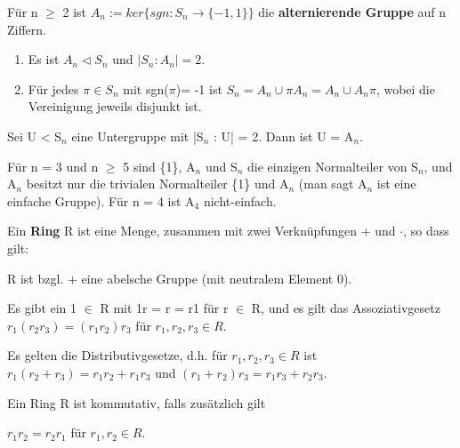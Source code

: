 \begin{definition}
Für n $\ge$ 2 ist $A_n := ker\{sgn : S_n \to \{-1,1\}\}$ die \textbf{alternierende Gruppe} auf n Ziffern.
\begin{enumerate}
\item Es ist $A_n \vartriangleleft S_n$ und $|S_n : A_n| = 2$.
\item Für jedes $\pi \in S_n$ mit sgn($\pi$)= -1 ist $S_n = A_n \cup \pi A_n = A_n \cup A_n \pi$, wobei die Vereinigung jeweils disjunkt ist.
\end{enumerate}
\end{definition}

\begin{example}
Sei U < S$_n$ eine Untergruppe mit |S$_n$ : U| = 2. Dann ist U = A$_n$.
\end{example}

\begin{remark}
Für n = 3 und n $\ge$ 5 sind \{1\}, A$_n$ und S$_n$ die einzigen Normalteiler von S$_n$, und A$_n$ besitzt nur die trivialen Normalteiler \{1\} und A$_n$ (man sagt A$_n$ ist eine einfache Gruppe). Für n = 4 ist A$_4$ nicht-einfach.
\end{remark}

\begin{definition}
Ein \textbf{Ring} R ist eine Menge, zusammen mit zwei Verknüpfungen + und $\cdot$, so dass gilt:
\begin{compactenum}
\item R ist bzgl. + eine abelsche Gruppe (mit neutralem Element 0).
\item Es gibt ein 1 $\in$ R mit 1r = r = r1 für r $\in$ R, und es gilt das Assoziativgesetz $r_1(r_2r_3) = (r_1r_2)r_3$ für $r_1, r_2, r_3 \in R$.
\item Es gelten die Distributivgesetze, d.h. für $r_1, r_2, r_3 \in R$ ist $r_1(r_2 + r_3) = r_1r_2 + r_1r_3$ und $(r_1 + r_2)r_3 = r_1r_3 + r_2r_3$.
\end{compactenum}
Ein Ring R ist kommutativ, falls zusätzlich gilt
\begin{compactenum}
\setcounter{enumi}{3}
\item $r_1r_2 = r_2r_1$ für $r_1,r_2 \in R$.
\end{compactenum}
\end{definition}

